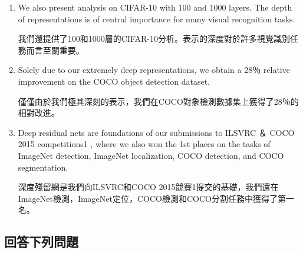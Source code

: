 \begin{enumerate}
\item We also present analysis on CIFAR-10 with 100 and 1000 layers. The depth of representations is of central importance for many visual recognition tasks. 

我們還提供了100和1000層的CIFAR-10分析。表示的深度對於許多視覺識別任務而言至關重要。

\item Solely due to our extremely deep representations, we obtain a 28％ relative improvement on the COCO object detection dataset. 

僅僅由於我們極其深刻的表示，我們在COCO對象檢測數據集上獲得了28％的相對改進。

\item Deep residual nets are foundations of our submissions to ILSVRC ＆ COCO 2015 competitions1 , where we also won the 1st places on the tasks of ImageNet detection, ImageNet localization, COCO detection, and COCO segmentation.

深度殘留網是我們向ILSVRC和COCO 2015競賽1提交的基礎，我們還在ImageNet檢測，ImageNet定位，COCO檢測和COCO分割任務中獲得了第一名。

\end{enumerate}

\subsection{回答下列問題}

